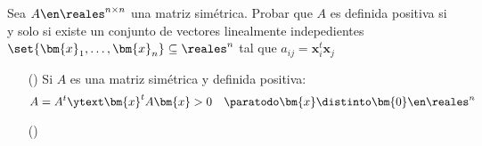 \begin{enunciado}{\ejercicio}
  Sea $A \en \reales^{n \times n}$ una matriz simétrica.
  Probar que $A$ es definida positiva si y solo si existe un conjunto
  de vectores linealmente indepedientes
  $\set{\bm{x}_1, \ldots, \bm{x}_n} \subseteq \reales^n $
  tal que $a_{ij} = \bm{x}_i^t \bm{x}_j$
\end{enunciado}

\begin{itemize}
  \item[(\red{$\Longrightarrow$})]
        Si $A$ es una matriz simétrica y definida positiva:
        $$
          A = A^t
          \ytext
                \bm{x}^t A \bm{x} > 0 \quad \paratodo \bm{x} \distinto \bm{0} \en \reales^n
        $$

  \item[(\red{$\Longleftarrow$})]
\end{itemize}

